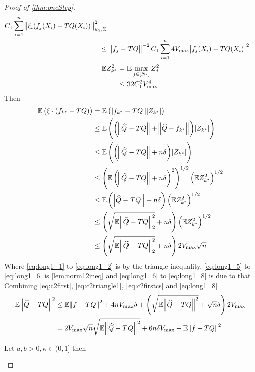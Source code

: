\begin{proof}[Proof of \cref{thm:oneStep}]
\begin{align}
    C_1 \sum_{i=1}^n \norm{\xi_i(f_j(X_i) - TQ(X_i))}_{\psi_2, \Sigma}^2
    \\ \leq &\; \norm{f_j - TQ}^{-2}
    C_1 \sum_{i=1}^n 4 V_{\max} \abs{f_j(X_i) - TQ(X_i)}^2
  \end{align}
  \begin{align}
    \mathbb{E} Z_{k^*}^2 = &\; \mathbb{E} \max_{j \in [N_\delta]} Z_j^2
    \\ \leq &\; 32 C_1^2 V_{\max}^4
  \end{align}
  Then
  \begin{align}
    \mathbb{E} \left( \xi \cdot (f_{k^*} - TQ) \right)
    &= \mathbb{E} \left( \norm{f_{k^*} - TQ} \abs{Z_{k^*}} \right)
    \label{eq:long1_1}
    \\ &\leq 
    \mathbb{E} \left( \left(\norm{\widehat{Q} - TQ} + \norm{\widehat{Q} - f_{k^*}} \right)
    \abs{Z_{k^*}} \right) 
    \label{eq:long1_2}
    \\ &\leq 
    \mathbb{E} \left( \left(\norm{\widehat{Q} - TQ} + n \delta \right)
    \abs{Z_{k^*}} \right) 
    \label{eq:long1_3}
    \\ &\leq 
    \left( \mathbb{E} \left(\norm{\widehat{Q} - TQ} + n \delta \right)^2 \right)^{1/2}
    \left( \mathbb{E} Z_{k^*}^2 \right)^{1/2} 
    \label{eq:long1_4}
    \\ &\leq 
    \mathbb{E} \left(\norm{\widehat{Q} - TQ} + n \delta \right) 
    \left( \mathbb{E} Z_{k^*}^2 \right)^{1/2} 
    \label{eq:long1_5}
    \\ &\leq 
    \left(\sqrt{ \mathbb{E} \norm{\widehat{Q} -TQ}_2^2 } + n \delta \right) 
    \left( \mathbb{E} Z_{k^*}^2 \right)^{1/2} 
    \label{eq:long1_6}
    \\ &\leq \left(\sqrt{\mathbb{E} \norm{\widehat{Q} -TQ}_2^2} + n \delta \right)
    2 V_{\max} \sqrt{n}
    \label{eq:long1_8}
  \end{align}
  Where \cref{eq:long1_1} to \cref{eq:long1_2} is by the triangle inequality,
  \cref{eq:long1_5} to \cref{eq:long1_6} is \cref{lem:norm12ineq}
  and \cref{eq:long1_6} to \cref{eq:long1_8} is due to that
  Combining \cref{eq:c2first}, \cref{eq:c2triangle1},
  \cref{eq:c2firstcs} and \cref{eq:long1_8}
  \begin{align}
    \mathbb{E} \norm{\widehat{Q} - TQ}^2 & \leq \mathbb{E} \norm{f - TQ}^2 + 4 n V_{\max} \delta
    + \left( \sqrt{\mathbb{E} \norm{\widehat{Q} - TQ}^2} + \sqrt{n} \delta \right)
    2 V_{\max} 
    \\ & = 2 V_{\max} \sqrt{n} \sqrt{\mathbb{E} \norm{\widehat{Q} - TQ}^2}
    + 6 n \delta V_{\max} + \mathbb{E} \norm{f - TQ}^2
    \label{eq:c2step1comb}
  \end{align}
  \begin{lem} Let $a,b>0, \kappa \in (0,1]$ then

\end{lem}
\end{proof}
